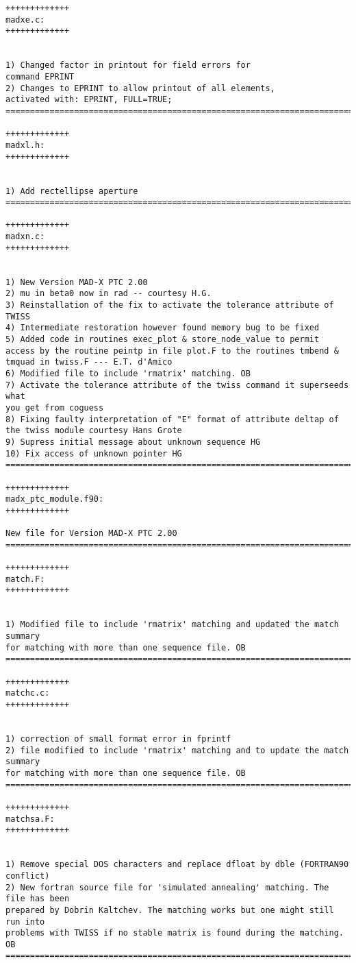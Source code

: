 \begin{verbatim}
+++++++++++++
madxe.c: 
+++++++++++++


1) Changed factor in printout for field errors for
command EPRINT
2) Changes to EPRINT to allow printout of all elements,
activated with: EPRINT, FULL=TRUE;
=============================================================================

+++++++++++++
madxl.h: 
+++++++++++++


1) Add rectellipse aperture
=============================================================================

+++++++++++++
madxn.c: 
+++++++++++++


1) New Version MAD-X PTC 2.00
2) mu in beta0 now in rad -- courtesy H.G.
3) Reinstallation of the fix to activate the tolerance attribute of TWISS
4) Intermediate restoration however found memory bug to be fixed
5) Added code in routines exec_plot & store_node_value to permit access by the routine peintp in file plot.F to the routines tmbend & tmquad in twiss.F --- E.T. d'Amico
6) Modified file to include 'rmatrix' matching. OB
7) Activate the tolerance attribute of the twiss command it superseeds what
you get from coguess
8) Fixing faulty interpretation of "E" format of attribute deltap of the twiss module courtesy Hans Grote
9) Supress initial message about unknown sequence HG
10) Fix access of unknown pointer HG
=============================================================================

+++++++++++++
madx_ptc_module.f90: 
+++++++++++++

New file for Version MAD-X PTC 2.00
=============================================================================

+++++++++++++
match.F: 
+++++++++++++


1) Modified file to include 'rmatrix' matching and updated the match summary
for matching with more than one sequence file. OB
=============================================================================

+++++++++++++
matchc.c: 
+++++++++++++


1) correction of small format error in fprintf
2) file modified to include 'rmatrix' matching and to update the match summary
for matching with more than one sequence file. OB
=============================================================================

+++++++++++++
matchsa.F: 
+++++++++++++


1) Remove special DOS characters and replace dfloat by dble (FORTRAN90 conflict)
2) New fortran source file for 'simulated annealing' matching. The file has been
prepared by Dobrin Kaltchev. The matching works but one might still run into
problems with TWISS if no stable matrix is found during the matching. OB
=============================================================================


\end{verbatim}
